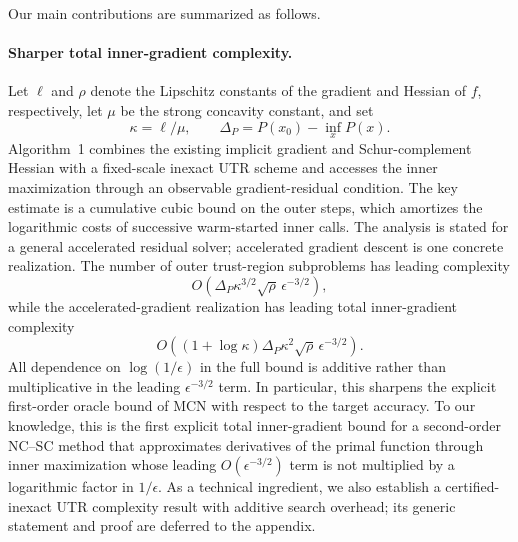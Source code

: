 Our main contributions are summarized as follows.

\paragraph{Sharper total inner-gradient complexity.}
Let $\ell$ and $\rho$ denote the Lipschitz constants of the gradient
and Hessian of $f$, respectively, let $\mu$ be the strong concavity
constant, and set
\[
    \kappa=\ell/\mu,
    \qquad
    \Delta_P=P(x_0)-\inf_xP(x).
\]
Algorithm~1 combines the existing implicit gradient and
Schur-complement Hessian with a fixed-scale inexact UTR scheme and
accesses the inner maximization through an observable
gradient-residual condition. The key estimate is a cumulative cubic
bound on the outer steps, which amortizes the logarithmic costs of
successive warm-started inner calls. The analysis is stated for a
general accelerated residual solver; accelerated gradient descent is
one concrete realization. The number of outer trust-region subproblems has
leading complexity
\[
    O\!\left(
        \Delta_P\kappa^{3/2}\sqrt{\rho}\,
        \epsilon^{-3/2}
    \right),
\]
while the accelerated-gradient realization has leading total
inner-gradient complexity
\[
    O\!\left(
        (1+\log\kappa)\Delta_P\kappa^2\sqrt{\rho}\,
        \epsilon^{-3/2}
    \right).
\]
All dependence on $\log(1/\epsilon)$ in the full bound is additive
rather than multiplicative in the leading $\epsilon^{-3/2}$ term.
In particular, this sharpens the explicit first-order oracle bound of
MCN with respect to the target accuracy. To our knowledge, this is the
first explicit total inner-gradient bound for a second-order NC--SC
method that approximates derivatives of the primal function through
inner maximization whose leading $O(\epsilon^{-3/2})$ term is not
multiplied by a logarithmic factor in $1/\epsilon$.
As a technical ingredient, we also establish a certified-inexact UTR
complexity result with additive search overhead; its generic statement
and proof are deferred to the appendix.

